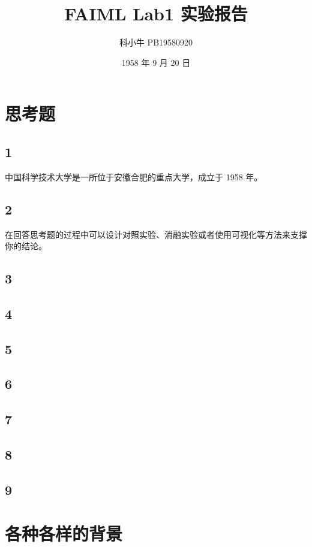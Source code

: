 \documentclass[UTF8,a4paper]{ctexart}
\title{FAIML Lab1 实验报告}
\author{科小牛 PB19580920}
\date{1958 年 9 月 20 日}
\begin{document}
\maketitle

\section{思考题}

\subsection*{1}

中国科学技术大学是一所位于安徽合肥的重点大学，成立于 1958 年。

\subsection*{2}

在回答思考题的过程中可以设计对照实验、消融实验或者使用可视化等方法来支撑你的结论。

\subsection*{3}
\subsection*{4}
\subsection*{5}
\subsection*{6}
\subsection*{7}
\subsection*{8}
\subsection*{9}

\newpage
\appendix

\section{各种各样的背景}
\end{document}
